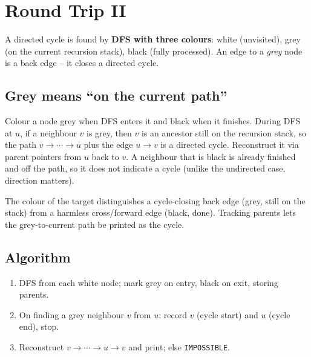 \section{Round Trip II}
\label{sec:cses-round-trip-ii}


\begin{patternbox}
A directed cycle is found by \textbf{DFS with three colours}: white
(unvisited), grey (on the current recursion stack), black (fully
processed). An edge to a \emph{grey} node is a back edge -- it closes a
directed cycle.
\end{patternbox}

\subsection*{Grey means ``on the current path''}

Colour a node grey when DFS enters it and black when it finishes. During
DFS at $u$, if a neighbour $v$ is grey, then $v$ is an ancestor still on the
recursion stack, so the path $v\to\cdots\to u$ plus the edge $u\to v$ is a
directed cycle. Reconstruct it via parent pointers from $u$ back to $v$. A
neighbour that is black is already finished and off the path, so it does not
indicate a cycle (unlike the undirected case, direction matters).

\begin{ideabox}
The colour of the target distinguishes a cycle-closing back edge (grey,
still on the stack) from a harmless cross/forward edge (black, done).
Tracking parents lets the grey-to-current path be printed as the cycle.
\end{ideabox}

\subsection*{Algorithm}

\begin{enumerate}
  \item DFS from each white node; mark grey on entry, black on exit,
        storing parents.
  \item On finding a grey neighbour $v$ from $u$: record $v$ (cycle start)
        and $u$ (cycle end), stop.
  \item Reconstruct $v\to\cdots\to u\to v$ and print; else
        \texttt{IMPOSSIBLE}.
\end{enumerate}

